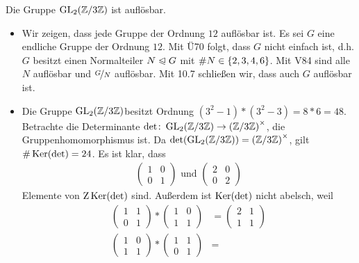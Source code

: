 \begin{exercisePage}
    \newcommand{\gruppegl}{\ensuremath{\GL_2(\rest{3})}}
    \begin{exercise}
        Die Gruppe $\operatorname{GL}_2(\mathbb{Z} / 3 \mathbb{Z})$ ist auflösbar.
    \end{exercise}
    \begin{solution}
        \begin{itemize}[leftmargin=*]
            \item Wir zeigen, dass jede Gruppe der Ordnung $12$ auflösbar ist. Es sei $G$ eine endliche Gruppe der Ordnung $12$. Mit Ü70 folgt, dass $G$ nicht einfach ist, d.h. $G$ besitzt einen Normalteiler $N \mathrel{\trianglelefteqslant} G$ mit $\# N \in \left\{ 2,3,4,6 \right\}$. Mit V84 sind alle $N$ auflösbar und $\lfrac{G}{N}$ auflösbar. Mit 10.7 schließen wir, dass auch $G$ auflösbar ist.
            \item Die Gruppe \gruppegl besitzt Ordnung $(3^2-1) * (3^2-3) = 8*6=48$. Betrachte die Determinante $\abb{\det}{\gruppegl}{\einheit{(\rest{3})}}$, die Gruppenhomomorphismus ist. Da $\det(\gruppegl)=\einheit{(\rest{3})}$, gilt $\# \operatorname{Ker}(\det) = 24$. Es ist klar, dass 
            \begin{align*}
                \begin{pmatrix} 1 & 0 \\ 0 & 1 \end{pmatrix} \text{ und }
                \begin{pmatrix} 2 & 0 \\ 0 & 2 \end{pmatrix}
            \end{align*}
            Elemente von $\operatorname{Z}{\operatorname{Ker}(\det)}$ sind. Außerdem ist $\operatorname{Ker}(\det)$ nicht abelsch, weil
            \begin{align*}
                \begin{pmatrix} 1 & 1 \\ 0 & 1 \end{pmatrix} *
                \begin{pmatrix} 1 & 0 \\ 1 & 1 \end{pmatrix} &=
                \begin{pmatrix} 2 & 1 \\ 1 & 1 \end{pmatrix} \\
                \begin{pmatrix} 1 & 0 \\ 1 & 1 \end{pmatrix} *
                \begin{pmatrix} 1 & 1 \\ 0 & 1 \end{pmatrix} &=

\end{align*}
\end{itemize}
\end{solution}
\end{exercisePage}
